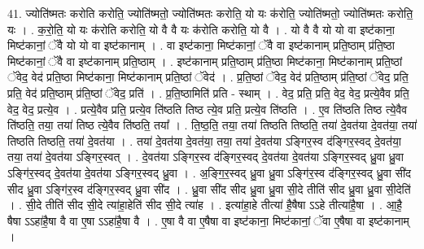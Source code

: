 \documentclass[17pt]{extarticle}
\begin{document}
41. ज्योति॑ष्मतः करोति करोति॒ ज्योति॑ष्मतो॒ ज्योति॑ष्मतः करोति॒ यो यः क॑रोति॒ ज्योति॑ष्मतो॒ ज्योति॑ष्मतः करोति॒ यः । . क॒रो॒ति॒ यो यः क॑रोति करोति॒ यो वै वै यः क॑रोति करोति॒ यो वै । . यो वै वै यो यो वा इष्ट॑काना॒ मिष्ट॑कानां॒ ॅवै यो यो वा इष्ट॑कानाम् । . वा इष्ट॑काना॒ मिष्ट॑कानां॒ ॅवै वा इष्ट॑कानाम् प्रति॒ष्ठाम् प्र॑ति॒ष्ठा मिष्ट॑कानां॒ ॅवै वा इष्ट॑कानाम् प्रति॒ष्ठाम् । . इष्ट॑कानाम् प्रति॒ष्ठाम् प्र॑ति॒ष्ठा मिष्ट॑काना॒ मिष्ट॑कानाम् प्रति॒ष्ठां ॅवेद॒ वेद॑ प्रति॒ष्ठा मिष्ट॑काना॒ मिष्ट॑कानाम् प्रति॒ष्ठां ॅवेद॑ । . प्र॒ति॒ष्ठां ॅवेद॒ वेद॑ प्रति॒ष्ठाम् प्र॑ति॒ष्ठां ॅवेद॒ प्रति॒ प्रति॒ वेद॑ प्रति॒ष्ठाम् प्र॑ति॒ष्ठां ॅवेद॒ प्रति॑ । . प्र॒ति॒ष्ठामिति॑ प्रति - स्थाम् । . वेद॒ प्रति॒ प्रति॒ वेद॒ वेद॒ प्रत्ये॒वैव प्रति॒ वेद॒ वेद॒ प्रत्ये॒व । . प्रत्ये॒वैव प्रति॒ प्रत्ये॒व ति॑ष्ठति तिष्ठ त्ये॒व प्रति॒ प्रत्ये॒व ति॑ष्ठति । . ए॒व ति॑ष्ठति तिष्ठ त्ये॒वैव ति॑ष्ठति॒ तया॒ तया॑ तिष्ठ त्ये॒वैव ति॑ष्ठति॒ तया᳚ । . ति॒ष्ठ॒ति॒ तया॒ तया॑ तिष्ठति तिष्ठति॒ तया॑ दे॒वत॑या दे॒वत॑या॒ तया॑ तिष्ठति तिष्ठति॒ तया॑ दे॒वत॑या । . तया॑ दे॒वत॑या दे॒वत॑या॒ तया॒ तया॑ दे॒वत॑या ऽङ्गिर॒स्व द॑ङ्गिर॒स्वद् दे॒वत॑या॒ तया॒ तया॑ दे॒वत॑या ऽङ्गिर॒स्वत् । . दे॒वत॑या ऽङ्गिर॒स्व द॑ङ्गिर॒स्वद् दे॒वत॑या दे॒वत॑या ऽङ्गिर॒स्वद् ध्रु॒वा ध्रु॒वा ऽङ्गि॑र॒स्वद् दे॒वत॑या दे॒वत॑या ऽङ्गिर॒स्वद् ध्रु॒वा । . अ॒ङ्गि॒र॒स्वद् ध्रु॒वा ध्रु॒वा ऽङ्गि॑र॒स्व द॑ङ्गिर॒स्वद् ध्रु॒वा सी॑द सीद ध्रु॒वा ऽङ्गि॑र॒स्व द॑ङ्गिर॒स्वद् ध्रु॒वा सी॑द । . ध्रु॒वा सी॑द सीद ध्रु॒वा ध्रु॒वा सी॒दे तीति॑ सीद ध्रु॒वा ध्रु॒वा सी॒देति॑ । . सी॒दे तीति॑ सीद सी॒दे त्या॑हा॒हेति॑ सीद सी॒दे त्या॑ह । . इत्या॑हा॒हे तीत्या॑ है॒षैषा ऽऽहे तीत्या॑है॒षा । . आ॒है॒ षैषा ऽऽहा॑है॒षा वै वा ए॒षा ऽऽहा॑है॒षा वै । . ए॒षा वै वा ए॒षैषा वा इष्ट॑काना॒ मिष्ट॑कानां॒ ॅवा ए॒षैषा वा इष्ट॑कानाम् । \newline
\end{document}
